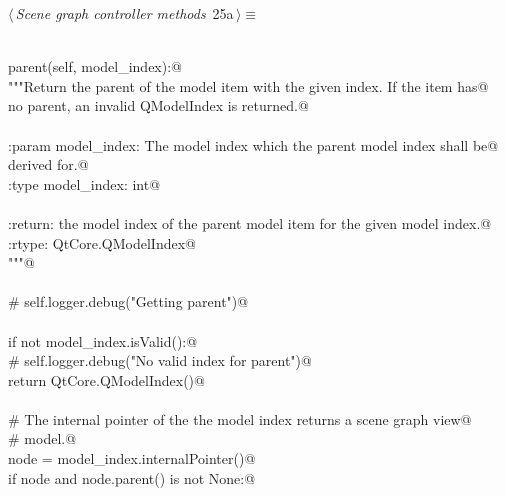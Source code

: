 \documentclass[
    a4paper,      %
    10pt,         %
    openright,    %
    notitlepage,  %
    parskip=half, %
]{scrreprt}       %
\theoremstyle{definition}                    %
\begin{document}
\begin{flushleft} \small
\begin{minipage}{\linewidth}\label{scrap23}\raggedright\small
{} $\langle\,${\itshape Scene graph controller methods}\nobreak\ {\footnotesize {25a}}$\,\rangle\equiv$
\vspace{-1exm}
\begin{list}{}{} \item
\mbox{}\lstinline@@\\
\mbox{}\lstinline@def parent(self, model_index):@\\
\mbox{}\lstinline@    """Return the parent of the model item with the given index. If the item has@\\
\mbox{}\lstinline@    no parent, an invalid QModelIndex is returned.@\\
\mbox{}\lstinline@@\\
\mbox{}\lstinline@    :param model_index: The model index which the parent model index shall be@\\
\mbox{}\lstinline@                        derived for.@\\
\mbox{}\lstinline@    :type model_index: int@\\
\mbox{}\lstinline@@\\
\mbox{}\lstinline@    :return: the model index of the parent model item for the given model index.@\\
\mbox{}\lstinline@    :rtype: QtCore.QModelIndex@\\
\mbox{}\lstinline@    """@\\
\mbox{}\lstinline@@\\
\mbox{}\lstinline@    # self.logger.debug("Getting parent")@\\
\mbox{}\lstinline@@\\
\mbox{}\lstinline@    if not model_index.isValid():@\\
\mbox{}\lstinline@        # self.logger.debug("No valid index for parent")@\\
\mbox{}\lstinline@        return QtCore.QModelIndex()@\\
\mbox{}\lstinline@@\\
\mbox{}\lstinline@    # The internal pointer of the the model index returns a scene graph view@\\
\mbox{}\lstinline@    # model.@\\
\mbox{}\lstinline@    node = model_index.internalPointer()@\\
\mbox{}\lstinline@    if node and node.parent() is not None:@\\

\end{list}
\end{minipage}
\end{flushleft}
\end{document}
